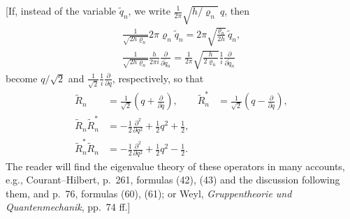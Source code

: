 \documentclass[fontsize=13pt,twoside,openany,headings=normal,parskip=false,bookmarkpackage=false,DIV=calc]{scrbook}
\begin{document}
[If, instead of the variable $\widetilde q_n$, we write $\frac1{2\pi}\sqrt{h/\varrho_n}\,q$, then
\begin{gather*}
 \frac1{\sqrt{2h\varrho_n}}2\pi\varrho_n\widetilde q_n
 =2\pi\sqrt{\frac{\varrho_n}{2h}}\,\widetilde q_n,\\
 \frac1{\sqrt{2h\varrho_n}}\frac h{2\pi i}\frac\partial{\partial\widetilde q_n}
 =\frac1{2\pi}\sqrt{\frac h{2\varrho_n}}\frac1i\frac\partial{\partial\widetilde q_n}
\end{gather*}
become $q/\sqrt2$ and $\frac1{\sqrt2}\frac1i\frac\partial{\partial q}$, respectively, so that
\begin{align*}
 \widetilde R_n&=\frac1{\sqrt2}\left(q+\frac\partial{\partial q}\right),&
 \widetilde R_n^*&=\frac1{\sqrt2}\left(q-\frac\partial{\partial q}\right),\\
 \widetilde R_n\widetilde R_n^*&=-\frac12\frac{\partial^2}{\partial q^2}+\frac12q^2+\frac12,\\
 \widetilde R_n^*\widetilde R_n&=-\frac12\frac{\partial^2}{\partial q^2}+\frac12q^2-\frac12.
\end{align*}
The reader will find the eigenvalue theory of these operators in many accounts, e.g., Courant--Hilbert, p.~261, formulas (42), (43) and the discussion following them, and p.~76, formulas (60), (61); or Weyl, \emph{Gruppentheorie und Quantenmechanik}, pp.~74 ff.]
\end{document}
